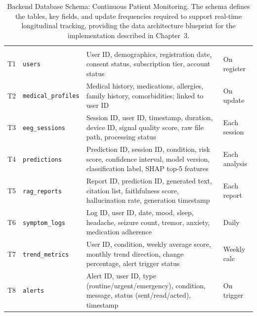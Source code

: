 {\tablestripes\tablefontsize
\begin{xltabular}{\textwidth}{@{} >{\raggedright\arraybackslash}p{0.6cm} >{\raggedright\arraybackslash}p{2.8cm} L >{\raggedright\arraybackslash}p{1.5cm} @{}}
\caption[Backend Database Schema: Continuous Patient Monitoring]{Backend Database Schema: Continuous Patient Monitoring. The schema defines the tables, key fields, and update frequencies required to support real-time longitudinal tracking, providing the data architecture blueprint for the implementation described in Chapter~3.}\label{tab:backend_db} \\
\toprule
\thead{\#} &  &  &  \\
\midrule
\endfirsthead
\toprule
\thead{\#} &  &  &  \\
\midrule
\endhead
\bottomrule
\endlastfoot
T1 & \texttt{users} & User ID, demographics, registration date, consent status, subscription tier, account status & On register \\
\addlinespace
T2 & \texttt{medical\_\allowbreak profiles} & Medical history, medications, allergies, family history, comorbidities; linked to user ID & On update \\
\addlinespace
T3 & \texttt{eeg\_\allowbreak sessions} & Session ID, user ID, timestamp, duration, device ID, signal quality score, raw file path, processing status & Each session \\
\addlinespace
T4 & \texttt{predictions} & Prediction ID, session ID, condition, risk score, confidence interval, model version, classification label, SHAP top-5 features & Each analysis \\
\addlinespace
T5 & \texttt{rag\_\allowbreak reports} & Report ID, prediction ID, generated text, citation list, faithfulness score, hallucination rate, generation timestamp & Each report \\
\addlinespace
T6 & \texttt{symptom\_\allowbreak logs} & Log ID, user ID, date, mood, sleep, headache, seizure count, tremor, anxiety, medication adherence & Daily \\
\addlinespace
T7 & \texttt{trend\_\allowbreak metrics} & User ID, condition, weekly average score, monthly trend direction, change percentage, alert trigger status & Weekly calc \\
\addlinespace
T8 & \texttt{alerts} & Alert ID, user ID, type (routine/urgent/emergency), condition, message, status (sent/read/acted), timestamp & On trigger \\

\end{xltabular}}
